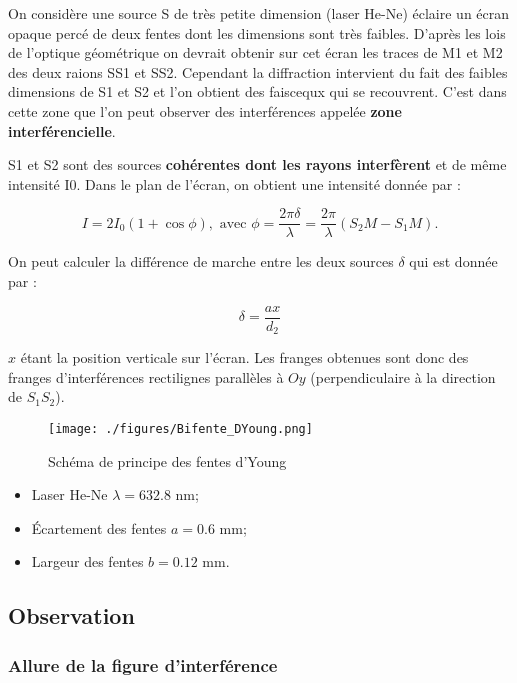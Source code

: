 \documentclass[french]{article}
\begin{document}
On considère une source S de très petite dimension (laser He-Ne) éclaire un écran opaque percé de deux fentes dont les dimensions sont très faibles. D'après les lois de l'optique géométrique on devrait obtenir sur cet écran les traces de M1 et M2 des deux raions SS1 et SS2. Cependant la diffraction intervient du fait des faibles dimensions de S1 et S2 et l'on obtient des faiscequx qui se recouvrent. C'est dans cette zone que l'on peut observer des interférences appelée \textbf{zone interférencielle}. 

S1 et S2 sont des sources \textbf{cohérentes dont les rayons interfèrent} et de même intensité I0. Dans le plan de l'écran, on obtient une intensité donnée par : 
\begin{definition}
\begin{equation}
	I = 2I_0\left(1+\cos\phi\right), \text{ avec } \phi = \frac{2\pi\delta}{\lambda} = \frac{2\pi}{\lambda}\left(S_2M-S_1M\right). 
\end{equation}
\end{definition}
On peut calculer la différence de marche entre les deux sources $\delta$ qui est donnée par : 

\begin{equation}
	\delta = \frac{ax}{d_2}
\end{equation}

$x$ étant la position verticale sur l'écran. Les franges obtenues sont donc des franges d'interférences rectilignes parallèles à $Oy$ (perpendiculaire à la direction de $S_1S_2$).
\begin{figure}[!ht]
	\centering
	\texttt{[image: ./figures/Bifente\_DYoung.png]}
	\caption{Schéma de principe des fentes d'Young}
\end{figure}

\begin{remarque}
	\begin{itemize}
		\item Laser He-Ne $\lambda = 632.8$ nm;
		\item Écartement des fentes $a = 0.6$ mm;
		\item Largeur des fentes $b = 0.12$ mm.
	\end{itemize}
\end{remarque}

\subsection{Observation}
\subsubsection{Allure de la figure d'interférence}
\end{document}
